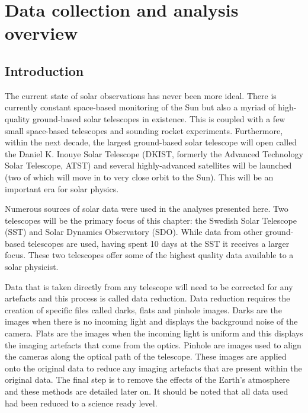 \graphicspath{{Chapter2/Figs/}}

\chapter{Data collection and analysis overview}
	
	\vspace*{\fill}\par
    \pagebreak
	 
\section{Introduction}

	The current state of solar observations has never been more ideal.
	There is currently constant space-based monitoring of the Sun but also a myriad of high-quality ground-based solar telescopes in existence.
    This is coupled with a few small space-based telescopes and sounding rocket experiments.
	Furthermore, within the next decade, the largest ground-based solar telescope will open called the Daniel K. Inouye Solar Telescope (DKIST, formerly the Advanced Technology Solar Telescope, ATST) and several highly-advanced satellites will be launched (two of which will move in to very close orbit to the Sun).
	This will be an important era for solar physics.
	
	Numerous sources of solar data were used in the analyses presented here.
	Two telescopes will be the primary focus of this chapter: the Swedish Solar Telescope (SST) and Solar Dynamics Observatory (SDO).
	While data from other ground-based telescopes are used, having spent 10 days at the SST it receives a larger focus.
	These two telescopes offer some of the highest quality data available to a solar physicist.
	
	Data that is taken directly from any telescope will need to be corrected for any artefacts and this process is called data reduction. 
	Data reduction requires the creation of specific files called darks, flats and pinhole images.
	Darks are the images when there is no incoming light and displays the background noise of the camera.
	Flats are the images when the incoming light is uniform and this displays the imaging artefacts that come from the optics.
	Pinhole are images used to align the cameras along the optical path of the telescope.
	These images are applied onto the original data to reduce any imaging artefacts that are present within the original data.
	The final step is to remove the effects of the Earth's atmosphere and these methods are detailed later on.
	It should be noted that all data used had been reduced to a science ready level.
	
